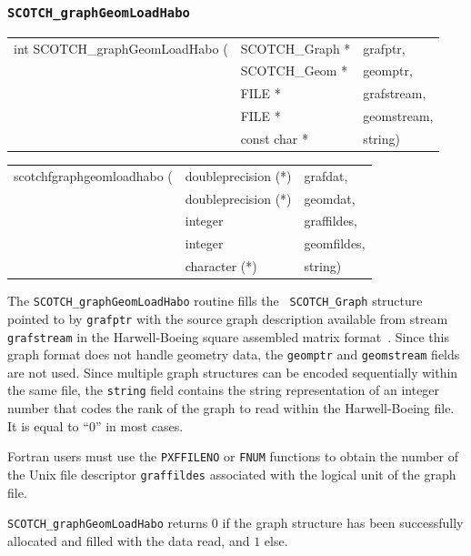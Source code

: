 \subsubsection{{\tt SCOTCH\_graphGeomLoadHabo}}

\begin{itemize}
\progsyn

{\tt\begin{tabular}{l@{}ll}
int SCOTCH\_graphGeomLoadHabo ( & SCOTCH\_Graph * & grafptr, \\
                                & SCOTCH\_Geom *  & geomptr, \\
                                & FILE *          & grafstream, \\
                                & FILE *          & geomstream, \\
                                & const char *    & string)
\end{tabular}}

{\tt\begin{tabular}{l@{}ll}
scotchfgraphgeomloadhabo ( & doubleprecision (*) & grafdat,    \\
                           & doubleprecision (*) & geomdat,    \\
                           & integer             & graffildes, \\
                           & integer             & geomfildes, \\
                           & character (*)       & string)
\end{tabular}}

\progdes

The {\tt SCOTCH\_graphGeomLoadHabo} routine fills the {\tt
SCOTCH\_\lbt Graph} structure pointed to by {\tt grafptr} with the
source graph description available from stream {\tt graf\lbt stream}
in the Harwell-Boeing square assembled matrix format~\cite{dugrle92}.
Since this graph format does not handle geometry data, the
{\tt geomptr} and {\tt geom\lbt stream} fields are not used. Since
multiple graph structures can be encoded sequentially within the same
file, the {\tt string} field contains the string representation of an
integer number that codes the rank of the graph to read within the
Harwell-Boeing file. It is equal to ``0'' in most cases.

Fortran users must use the {\tt PXFFILENO} or {\tt FNUM} functions to
obtain the number of the Unix file descriptor {\tt graf\lbt fildes}
associated with the logical unit of the graph file.

\progret

{\tt SCOTCH\_graphGeomLoadHabo} returns $0$ if the graph structure has
been successfully allocated and filled with the data read, and $1$ else.
\end{itemize}

